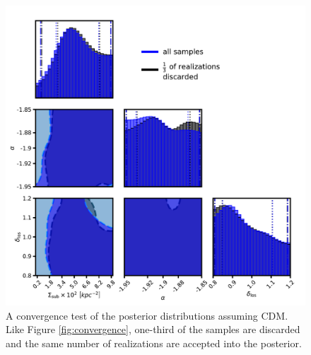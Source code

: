 \begin{figure}
	\includegraphics[clip,trim=0cm 0cm 0cm
	0cm,width=.95\textwidth,keepaspectratio]{./figures_wdmchillsout/CDM_convergencetest.pdf}
	\caption[Convergence test of the posteriors assuming CDM]{\label{fig:convergence_CDM} A convergence test of the posterior distributions assuming CDM. Like Figure \ref{fig:convergence}, one-third of the samples are discarded and the same number of realizations are accepted into the posterior.}
\end{figure}

